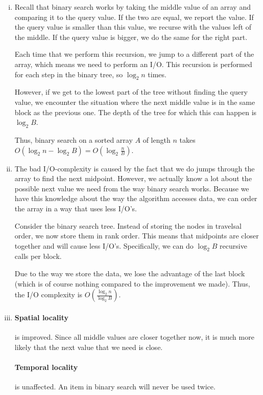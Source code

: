 \begin{enumerate}[(i)]
	\item Recall that binary search works by taking the middle value of an array and comparing it to the query value.
		If the two are equal, we report the value.
		If the query value is smaller than this value, we recurse with the values left of the middle.
		If the query value is bigger, we do the same for the right part.

		Each time that we perform this recursion, we jump to a different part of the array, which means we need to perform an I/O.
		This recursion is performed for each step in the binary tree, so $\log_2{n}$ times.

		However, if we get to the lowest part of the tree without finding the query value, we encounter the situation where the next middle value is in the same block as the previous one.
		The depth of the tree for which this can happen is $\log_2{B}$.

		Thus, binary search on a sorted array $A$ of length $n$ takes $O(\log_2{n} - \log_2{B}) = O(\log_2{\frac{n}{B}})$.
	\item The bad I/O-complexity is caused by the fact that we do jumps through the array to find the next midpoint.
		However, we actually know a lot about the possible next value we need from the way binary search works.
		Because we have this knowledge about the way the algorithm accesses data, we can order the array in a way that uses less I/O's.

		Consider the binary search tree.
		Instead of storing the nodes in travelsal order, we now store them in rank order.
		This means that midpoints are closer together and will cause less I/O's.
		Specifically, we can do $\log_2{B}$ recursive calls per block.

		Due to the way we store the data, we lose the advantage of the last block (which is of course nothing compared to the improvement we made).
		Thus, the I/O complexity is $O(\frac{\log_2{n}}{\log_2{B}})$.
	\item \paragraph{Spatial locality} is improved. Since all middle values are closer together now, it is much more likely that the next value that we need is close.
		\paragraph{Temporal locality} is unaffected. An item in binary search will never be used twice.
\end{enumerate}
